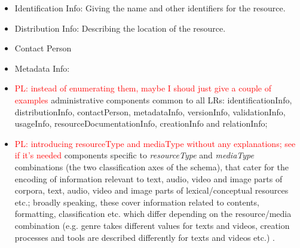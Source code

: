 \documentclass{llncs}
\begin{document}
\begin{itemize}
    \item Identification Info: Giving the name and other identifiers for the
        resource.
    \item Distribution Info: Describing the location of the resource.
    \item Contact Person
    \item Metadata Info: 
\item \textcolor{red}{PL: instead of enumerating them, maybe I shoud just give a couple of examples} administrative components common to all LRs: identificationInfo, distributionInfo, contactPerson, metadataInfo, versionInfo, validationInfo, usageInfo, resourceDocumentationInfo, creationInfo and relationInfo;
\item \textcolor{red}{PL: introducing resourceType and mediaType without any explanations; see if it's needed} \color[rgb]{0,0,0}\color[rgb]{0,0,0} components specific to {\it resourceType} and {\it mediaType} combinations (the two classification axes of the schema), that cater for the encoding of information relevant to text, audio, video and image parts of corpora, text, audio, video and image parts of lexical/conceptual resources etc.; broadly speaking, these cover information related to contents, formatting, classification etc. which differ depending on the resource/media combination (e.g. genre takes different values for texts and videos, creation processes and tools are described differently for texts and videos etc.) .
\end{itemize}
\end{document}
